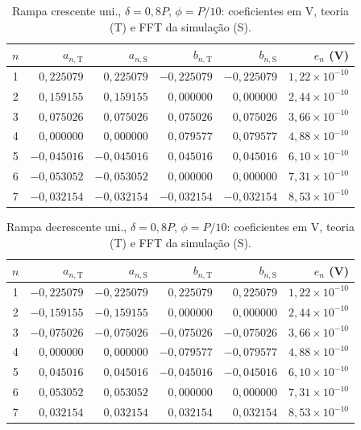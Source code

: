 \begin{table}[H]
\centering
\footnotesize\setlength{\tabcolsep}{2pt}
\caption{Rampa crescente uni., $\delta=0{,}8P$, $\phi=P/10$: coeficientes em V, teoria (T) e FFT da simulação (S).}\label{tab:coef_comp13}
\begin{tabular}{crrrrr}\hline
$n$ & $a_{n,\mathrm T}$ & $a_{n,\mathrm S}$ & $b_{n,\mathrm T}$ & $b_{n,\mathrm S}$ & $e_n$ (V) \\ \hline
1 & $0{,}225079$ & $0{,}225079$ & $-0{,}225079$ & $-0{,}225079$ & $1{,}22\!\times\!10^{-10}$ \\
2 & $0{,}159155$ & $0{,}159155$ & $0{,}000000$ & $0{,}000000$ & $2{,}44\!\times\!10^{-10}$ \\
3 & $0{,}075026$ & $0{,}075026$ & $0{,}075026$ & $0{,}075026$ & $3{,}66\!\times\!10^{-10}$ \\
4 & $0{,}000000$ & $0{,}000000$ & $0{,}079577$ & $0{,}079577$ & $4{,}88\!\times\!10^{-10}$ \\
5 & $-0{,}045016$ & $-0{,}045016$ & $0{,}045016$ & $0{,}045016$ & $6{,}10\!\times\!10^{-10}$ \\
6 & $-0{,}053052$ & $-0{,}053052$ & $0{,}000000$ & $0{,}000000$ & $7{,}31\!\times\!10^{-10}$ \\
7 & $-0{,}032154$ & $-0{,}032154$ & $-0{,}032154$ & $-0{,}032154$ & $8{,}53\!\times\!10^{-10}$ \\
\hline\end{tabular}
\end{table}
\begin{table}[H]
\centering
\footnotesize\setlength{\tabcolsep}{2pt}
\caption{Rampa decrescente uni., $\delta=0{,}8P$, $\phi=P/10$: coeficientes em V, teoria (T) e FFT da simulação (S).}\label{tab:coef_comp14}
\begin{tabular}{crrrrr}\hline
$n$ & $a_{n,\mathrm T}$ & $a_{n,\mathrm S}$ & $b_{n,\mathrm T}$ & $b_{n,\mathrm S}$ & $e_n$ (V) \\ \hline
1 & $-0{,}225079$ & $-0{,}225079$ & $0{,}225079$ & $0{,}225079$ & $1{,}22\!\times\!10^{-10}$ \\
2 & $-0{,}159155$ & $-0{,}159155$ & $0{,}000000$ & $0{,}000000$ & $2{,}44\!\times\!10^{-10}$ \\
3 & $-0{,}075026$ & $-0{,}075026$ & $-0{,}075026$ & $-0{,}075026$ & $3{,}66\!\times\!10^{-10}$ \\
4 & $0{,}000000$ & $0{,}000000$ & $-0{,}079577$ & $-0{,}079577$ & $4{,}88\!\times\!10^{-10}$ \\
5 & $0{,}045016$ & $0{,}045016$ & $-0{,}045016$ & $-0{,}045016$ & $6{,}10\!\times\!10^{-10}$ \\
6 & $0{,}053052$ & $0{,}053052$ & $0{,}000000$ & $0{,}000000$ & $7{,}31\!\times\!10^{-10}$ \\
7 & $0{,}032154$ & $0{,}032154$ & $0{,}032154$ & $0{,}032154$ & $8{,}53\!\times\!10^{-10}$ \\
\hline\end{tabular}
\end{table}
